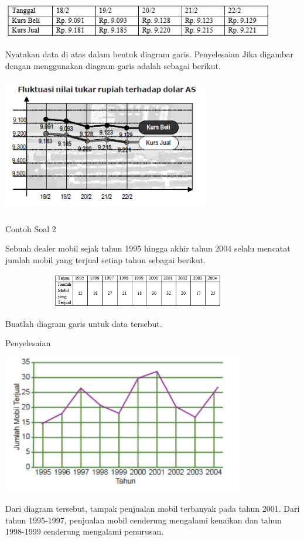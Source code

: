 \documentclass[11pt,fleqn]{book} %
\begin{document}
{\includegraphics[width = 12cm, height= 1.5cm]{Pictures/Gb1_diana.png}

Nyatakan data di atas dalam bentuk diagram garis.
Penyelesaian
Jika digambar dengan menggunakan diagram garis adalah sebagai berikut.

\includegraphics[width = 9cm, height= 6cm]{Pictures/Gb2_diana.png}


Contoh Soal 2

Sebuah dealer mobil sejak tahun 1995 hingga akhir tahun 2004 selalu mencatat jumlah mobil yang terjual setiap tahun sebagai berikut.

\includegraphics[width = 12cm, height= 1.5cm]{Pictures/Gb3_diana.png}

Buatlah diagram garis untuk data tersebut.

Penyelesaian

\includegraphics[width = 10.6cm, height= 6.1cm]{Pictures/Gb4_diana.png}


Dari diagram tersebut, tampak penjualan mobil terbanyak pada tahun 2001. Dari tahun 1995-1997, penjualan mobil cenderung mengalami kenaikan dan tahun 1998-1999 cenderung mengalami penurusan.

}
\end{document}
